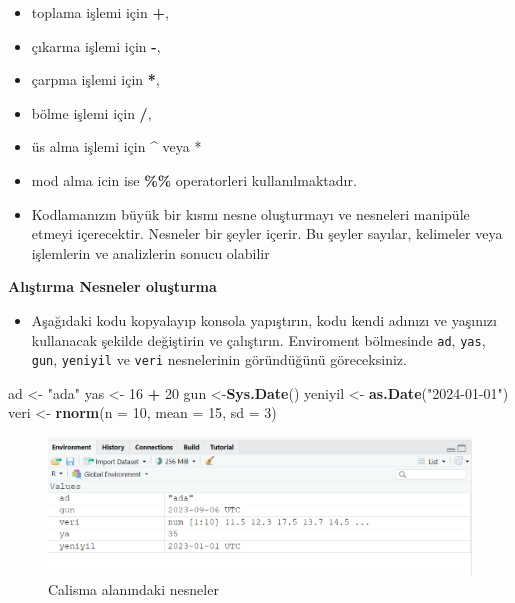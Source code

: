 \documentclass[
  oneside]{book}
\newenvironment{Shaded}{\begin{snugshade}}{\end{snugshade}}
\newcommand{\AttributeTok}[1]{\textcolor[rgb]{0.13,0.29,0.53}{#1}}
\newcommand{\DecValTok}[1]{\textcolor[rgb]{0.00,0.00,0.81}{#1}}
\newcommand{\FunctionTok}[1]{\textcolor[rgb]{0.13,0.29,0.53}{\textbf{#1}}}
\newcommand{\NormalTok}[1]{#1}
\newcommand{\OtherTok}[1]{\textcolor[rgb]{0.56,0.35,0.01}{#1}}
\newcommand{\SpecialCharTok}[1]{\textcolor[rgb]{0.81,0.36,0.00}{\textbf{#1}}}
\newcommand{\StringTok}[1]{\textcolor[rgb]{0.31,0.60,0.02}{#1}}
\providecommand{\tightlist}{%
  \setlength{\itemsep}{0pt}\setlength{\parskip}{0pt}}
\begin{document}
\begin{itemize}
\item
  toplama işlemi için \textbf{+},
\item
  çıkarma işlemi için \textbf{-},
\item
  çarpma işlemi için \textbf{*},
\item
  bölme işlemi için \textbf{/},
\item
  üs alma işlemi için \textbf{\^{}} veya *
\item
  mod alma icin ise \textbf{\%\%} operatorleri kullanılmaktadır.
\item
  Kodlamanızın büyük bir kısmı nesne oluşturmayı ve nesneleri manipüle etmeyi içerecektir. Nesneler bir şeyler içerir. Bu şeyler sayılar, kelimeler veya işlemlerin ve analizlerin sonucu olabilir
\end{itemize}

\textbf{Alıştırma Nesneler oluşturma}

\begin{itemize}
\tightlist
\item
  Aşağıdaki kodu kopyalayıp konsola yapıştırın, kodu kendi adınızı ve yaşınızı kullanacak şekilde değiştirin ve çalıştırın. Enviroment bölmesinde \texttt{ad}, \texttt{yas}, \texttt{gun}, \texttt{yeniyil} ve \texttt{veri} nesnelerinin göründüğünü göreceksiniz.
\end{itemize}

\begin{Shaded}
\begin{Highlighting}[]
\NormalTok{ad }\OtherTok{\textless{}{-}} \StringTok{"ada"}
\NormalTok{yas }\OtherTok{\textless{}{-}} \DecValTok{16} \SpecialCharTok{+} \DecValTok{20} 
\NormalTok{gun }\OtherTok{\textless{}{-}}\FunctionTok{Sys.Date}\NormalTok{()}
\NormalTok{yeniyil }\OtherTok{\textless{}{-}} \FunctionTok{as.Date}\NormalTok{(}\StringTok{"2024{-}01{-}01"}\NormalTok{)}
\NormalTok{veri }\OtherTok{\textless{}{-}} \FunctionTok{rnorm}\NormalTok{(}\AttributeTok{n =} \DecValTok{10}\NormalTok{, }\AttributeTok{mean =} \DecValTok{15}\NormalTok{, }\AttributeTok{sd =} \DecValTok{3}\NormalTok{)}
\end{Highlighting}
\end{Shaded}

\begin{figure}

{\centering \includegraphics[width=1\linewidth]{images/objects-enviro} 

}

\caption{Calisma alanındaki nesneler}\label{fig:img-objects-enviro}
\end{figure}
\end{document}
